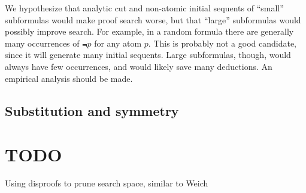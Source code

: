 We hypothesize that analytic cut and non-atomic initial sequents of ``small''
subformulas would make proof search worse, but that ``large'' subformulas
would possibly improve search.  For example, in a random formula there are
generally
many occurrences of $\Not p$ for any atom $p$.  This is probably not a good
candidate, since it will generate many initial sequents.  Large subformulas,
though, would always have few occurrences, and would likely save many
deductions.  An empirical analysis should be made.

\subsection*{Substitution and symmetry}

\section{TODO}
Using disproofs to prune search space, similar to Weich



